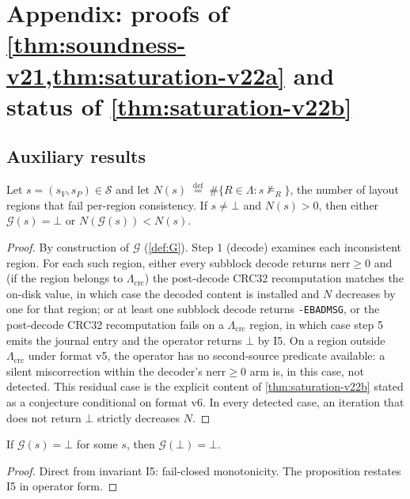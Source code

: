 \section{Appendix: proofs of \cref{thm:soundness-v21,thm:saturation-v22a} and status of \cref{thm:saturation-v22b}}\label{app:proof}

\subsection{Auxiliary results}

\begin{lemma}\label{lem:descent}
Let \(s = (s_V, s_P) \in \mathcal{S}\) and let
\(N(s) \;\stackrel{\mathrm{def}}{=}\; \#\{R \in \Lambda : s \not\models_R\}\),
the number of layout regions that fail per-region consistency.
If \(s \neq \bot\) and \(N(s) > 0\), then either
\(\mathcal{G}(s) = \bot\) or \(N(\mathcal{G}(s)) < N(s)\).
\end{lemma}

\begin{proof}
By construction of \(\mathcal{G}\) (\cref{def:G}). Step 1
(decode) examines each inconsistent region. For each such region,
either every subblock decode returns \(\mathrm{nerr} \geq 0\) and
(if the region belongs to \(\Lambda_{\mathrm{crc}}\)) the
post-decode CRC32 recomputation matches the on-disk value, in
which case the decoded content is installed and \(N\) decreases
by one for that region; or at least one subblock decode returns
\texttt{-EBADMSG}, or the post-decode CRC32 recomputation fails
on a \(\Lambda_{\mathrm{crc}}\) region, in which case step 5
emits the journal entry and the operator returns \(\bot\) by I5.
On a region outside \(\Lambda_{\mathrm{crc}}\) under format v5,
the operator has no second-source predicate available: a silent
miscorrection within the decoder's \(\mathrm{nerr} \geq 0\) arm
is, in this case, not detected. This residual case is the explicit
content of \cref{thm:saturation-v22b} stated as a conjecture
conditional on format v6. In every detected case, an iteration
that does not return \(\bot\) strictly decreases \(N\).
\end{proof}

\begin{proposition}\label{prop:absorb}
If \(\mathcal{G}(s) = \bot\) for some \(s\), then
\(\mathcal{G}(\bot) = \bot\).
\end{proposition}

\begin{proof}
Direct from invariant I5: fail-closed monotonicity. The proposition
restates I5 in operator form.
\end{proof}

